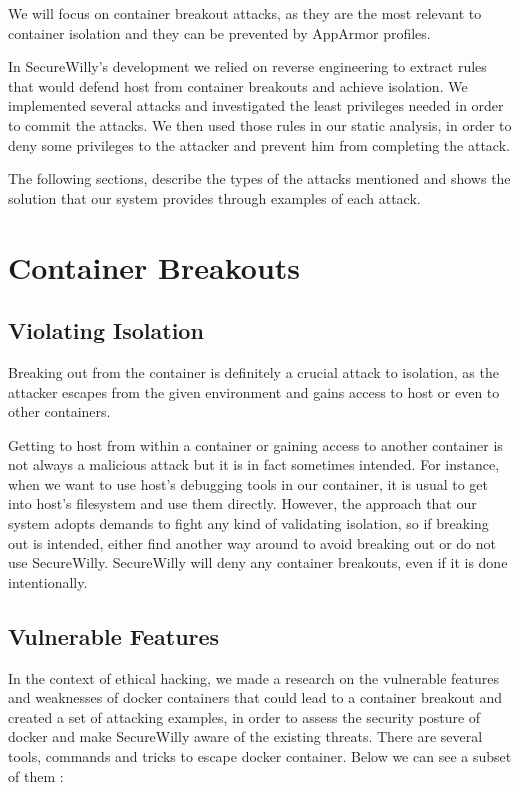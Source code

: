 We will focus on container breakout attacks, as they are the most relevant to container isolation and they can be prevented by AppArmor profiles.

In SecureWilly's development we relied on reverse engineering to extract rules that would defend host from container breakouts and achieve isolation. We implemented several attacks and investigated the least privileges needed in order to commit the attacks. We then used those rules in our static analysis, in order to deny some privileges to the attacker and prevent him from completing the attack.

The following sections, describe the types of the attacks mentioned and shows the solution that our system provides through examples of each attack.

\section{Container Breakouts}
\subsection{Violating Isolation}
Breaking out from the container is definitely a crucial attack to isolation, as the attacker escapes from the given environment and gains access to host or even to other containers.

Getting to host from within a container or gaining access to another container is not always a malicious attack but it is in fact sometimes intended. For instance, when we want to use host's debugging tools in our container, it is usual to get into host's filesystem and use them directly.
However, the approach that our system adopts demands to fight any kind of validating isolation, so if breaking out is intended, either find another way around to avoid breaking out or do not use SecureWilly. SecureWilly will deny any container breakouts, even if it is done intentionally.

\subsection{Vulnerable Features}
In the context of ethical hacking, we made a research on the vulnerable features and weaknesses of docker containers that could lead to a container breakout and created a set of attacking examples, in order to assess the security posture of docker and make SecureWilly aware of the existing threats.
There are several tools, commands and tricks to escape docker container. Below we can see a subset of them \cite{onentryattacks}: 

